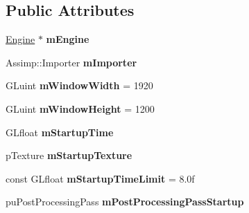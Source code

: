 \subsection*{Public Attributes}
\begin{DoxyCompactItemize}
\item 
\hypertarget{structfillwave_1_1Engine_1_1EngineImpl_a88f49dc2a2f91db6fef013e6fe5f4c07}{}\hyperlink{classfillwave_1_1Engine}{Engine} $\ast$ {\bfseries m\+Engine}\label{structfillwave_1_1Engine_1_1EngineImpl_a88f49dc2a2f91db6fef013e6fe5f4c07}

\item 
\hypertarget{structfillwave_1_1Engine_1_1EngineImpl_ac565498c52570520e8468ba0f2785d13}{}Assimp\+::\+Importer {\bfseries m\+Importer}\label{structfillwave_1_1Engine_1_1EngineImpl_ac565498c52570520e8468ba0f2785d13}

\item 
\hypertarget{structfillwave_1_1Engine_1_1EngineImpl_ae2691f3b1f1b15b80c76cbe3950a87d4}{}G\+Luint {\bfseries m\+Window\+Width} = 1920\label{structfillwave_1_1Engine_1_1EngineImpl_ae2691f3b1f1b15b80c76cbe3950a87d4}

\item 
\hypertarget{structfillwave_1_1Engine_1_1EngineImpl_a362b6a1ee3eb14b4f80e68e2736fd1cb}{}G\+Luint {\bfseries m\+Window\+Height} = 1200\label{structfillwave_1_1Engine_1_1EngineImpl_a362b6a1ee3eb14b4f80e68e2736fd1cb}

\item 
\hypertarget{structfillwave_1_1Engine_1_1EngineImpl_a001acb1c7ea7a13dd31b22461ec482b5}{}G\+Lfloat {\bfseries m\+Startup\+Time}\label{structfillwave_1_1Engine_1_1EngineImpl_a001acb1c7ea7a13dd31b22461ec482b5}

\item 
\hypertarget{structfillwave_1_1Engine_1_1EngineImpl_a854e82aaf53e54b34d9ee9c10200e9e8}{}p\+Texture {\bfseries m\+Startup\+Texture}\label{structfillwave_1_1Engine_1_1EngineImpl_a854e82aaf53e54b34d9ee9c10200e9e8}

\item 
\hypertarget{structfillwave_1_1Engine_1_1EngineImpl_aca249e6321d92809589c805e92388490}{}const G\+Lfloat {\bfseries m\+Startup\+Time\+Limit} = 8.\+0f\label{structfillwave_1_1Engine_1_1EngineImpl_aca249e6321d92809589c805e92388490}

\item 
\hypertarget{structfillwave_1_1Engine_1_1EngineImpl_a3f7ca8d7fc0aaf680159494aa177a3c2}{}pu\+Post\+Processing\+Pass {\bfseries m\+Post\+Processing\+Pass\+Startup}\label{structfillwave_1_1Engine_1_1EngineImpl_a3f7ca8d7fc0aaf680159494aa177a3c2}


\end{DoxyCompactItemize}
